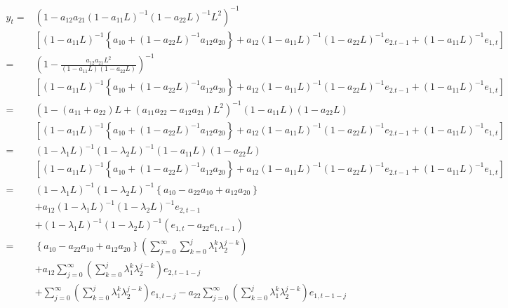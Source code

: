 \documentclass{article}
\begin{document}
\begin{align*}
	y_t = &\left( 1 - a_{12}a_{21} (1-a_{11}L)^{-1}(1-a_{22}L)^{-1} L^2\right)^{-1} \\
	&\left[(1-a_{11}L)^{-1} \left\{ a_{10}+(1-a_{22}L)^{-1} a_{12}a_{20} \right\}
	+ a_{12}(1-a_{11}{L})^{-1}(1-a_{22}L)^{-1}e_{2.t-1} + (1-a_{11}L)^{-1}e_{1,t} \right]\\[8pt]
	= &\left( 1 - \frac{a_{12}a_{21}L^2}{(1-a_{11}L)(1-a_{22}L)}\right)^{-1}\\
	&\left[(1-a_{11}L)^{-1} \left\{ a_{10}+(1-a_{22}L)^{-1} a_{12}a_{20} \right\}
	+ a_{12}(1-a_{11}{L})^{-1}(1-a_{22}L)^{-1}e_{2.t-1} + (1-a_{11}L)^{-1}e_{1,t} \right]\\[8pt]
	=&\left( 1-(a_{11} + a_{22})L + (a_{11}a_{22} - a_{12}a_{21})L^2 \right)^{-1} \left( 1-a_{11}L \right) \left( 1-a_{22}L \right)\\
	&\left[(1-a_{11}L)^{-1} \left\{ a_{10}+(1-a_{22}L)^{-1} a_{12}a_{20} \right\}
	+ a_{12}(1-a_{11}{L})^{-1}(1-a_{22}L)^{-1}e_{2.t-1} + (1-a_{11}L)^{-1}e_{1,t} \right]\\[8pt]
	=& (1- \lambda_1 L)^{-1} (1- \lambda_2 L)^{-1} \left( 1-a_{11}L \right) \left( 1-a_{22}L \right)\\
	&\left[(1-a_{11}L)^{-1} \left\{ a_{10}+(1-a_{22}L)^{-1} a_{12}a_{20} \right\}
	+ a_{12}(1-a_{11}{L})^{-1}(1-a_{22}L)^{-1}e_{2.t-1} + (1-a_{11}L)^{-1}e_{1,t} \right]\\[8pt]
	= & (1- \lambda_1 L)^{-1} (1- \lambda_2 L)^{-1} \left\{ a_{10} - a_{22} a_{10} + a_{12} a_{20} \right\}\\
	&+ a_{12} \left( 1-\lambda_1 L \right)^{-1} (1- \lambda_2 L)^{-1} e_{2,t-1}\\
	&+ (1- \lambda_1 L)^{-1} (1- \lambda_2 L)^{-1} \left( e_{1,t} - a_{22}e_{1,t-1} \right)\\[8pt]
	=&  \left\{ a_{10} - a_{22} a_{10} + a_{12} a_{20} \right\} \left( \sum_{j = 0}^{\infty} \sum_{k = 0}^{j} \lambda_1^k \lambda_2^{j-k} \right)\\
	&+a_{12} \sum_{j = 0}^{\infty}\left( \sum_{k = 0}^j \lambda_1^k \lambda_2^{j-k}\right) e_{2, t-1-j}\\
	&+  \sum_{j = 0}^{\infty} \left( \sum_{k = 0}^j \lambda_1^k \lambda_2^{j-k}\right) e_{1, t-j } - a_{22}  \sum_{j = 0}^{\infty} \left( \sum_{k = 0}^j \lambda_1^k \lambda_2^{j-k}\right) e_{1, t-1-j }
\end{align*}
\end{document}
